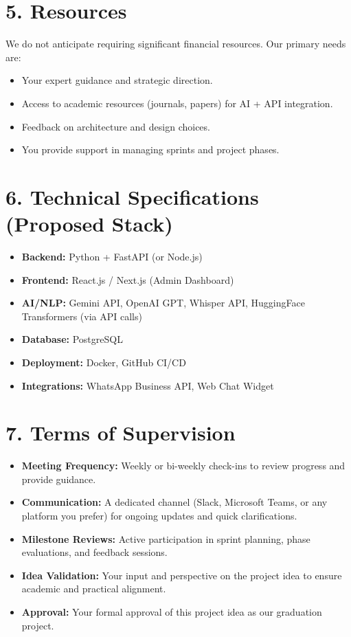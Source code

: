 \documentclass[12pt,a4paper]{article}
\begin{document}
\section*{5. Resources}
We do not anticipate requiring significant financial resources. Our primary needs are:
\begin{itemize}[leftmargin=*]
    \item Your expert guidance and strategic direction.  
    \item Access to academic resources (journals, papers) for AI + API integration.  
    \item Feedback on architecture and design choices.  
    \item You provide support in managing sprints and project phases.  
\end{itemize}


\section*{6. Technical Specifications (Proposed Stack)}
\begin{itemize}[leftmargin=*]
    \item \textbf{Backend:} Python + FastAPI (or Node.js)  
    \item \textbf{Frontend:} React.js / Next.js (Admin Dashboard)  
    \item \textbf{AI/NLP:} Gemini API, OpenAI GPT, Whisper API, HuggingFace Transformers (via API calls)  
    \item \textbf{Database:} PostgreSQL  
    \item \textbf{Deployment:} Docker, GitHub CI/CD  
    \item \textbf{Integrations:} WhatsApp Business API, Web Chat Widget  
\end{itemize}

\section*{7. Terms of Supervision}
\begin{itemize}[leftmargin=*]
    \item \textbf{Meeting Frequency:} Weekly or bi-weekly check-ins to review progress and provide guidance.  
    \item \textbf{Communication:} A dedicated channel (Slack, Microsoft Teams, or any platform you prefer) for ongoing updates and quick clarifications.  
    \item \textbf{Milestone Reviews:} Active participation in sprint planning, phase evaluations, and feedback sessions.  
    \item \textbf{Idea Validation:} Your input and perspective on the project idea to ensure academic and practical alignment.  
    \item \textbf{Approval:} Your formal approval of this project idea as our graduation project.  
\end{itemize}
\end{document}
